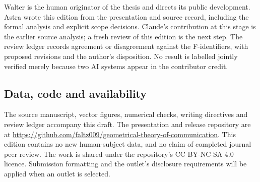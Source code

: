 \documentclass[11pt,a4paper]{article}
\begin{document}
Walter is the human originator of the thesis and directs its public development.
Astra wrote this edition from the presentation and source record, including
the formal analysis and explicit scope decisions. Claude's contribution at
this stage is the earlier source analysis; a fresh review of this edition is
the next step. The review ledger records agreement or disagreement against
the F-identifiers, with proposed revisions and the author's disposition.
No result is labelled jointly verified merely because two AI systems appear
in the contributor credit.

\subsection*{Data, code and availability}
The source manuscript, vector figures, numerical checks, writing directives
and review ledger accompany this draft. The presentation and release repository
are at \url{https://github.com/faltz009/geometrical-theory-of-communication}.
This edition contains no new human-subject data, and no claim of completed
journal peer review. The work is shared under the repository's CC BY-NC-SA 4.0
licence. Submission formatting and the outlet's disclosure requirements will
be applied when an outlet is selected.
\end{document}
